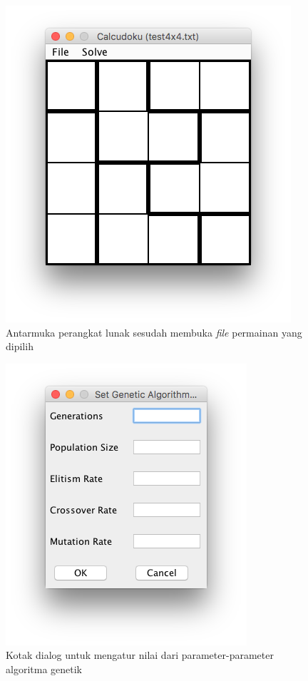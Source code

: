 \begin{figure}
\centering
\captionsetup{justification=centering}
\includegraphics[scale=0.5]{Gambar/ImplementasiPengujian/Calcudoku2.png}
\caption[Antarmuka perangkat lunak sesudah membuka \textit{file} permainan yang dipilih]{Antarmuka perangkat lunak sesudah membuka \textit{file} permainan yang dipilih}
\label{fig:antarmukapl3}
\end{figure}

\begin{figure}
\centering
\captionsetup{justification=centering}
\includegraphics[scale=0.5]{Gambar/ImplementasiPengujian/SetGAParameters.png}
\caption[Kotak dialog untuk mengatur nilai dari parameter-parameter algoritma genetik]{Kotak dialog untuk mengatur nilai dari parameter-parameter algoritma genetik}
\label{fig:antarmukapl4}
\end{figure}

